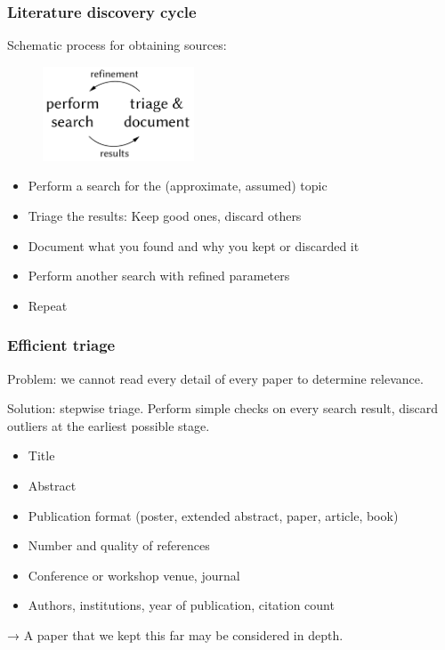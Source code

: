 \documentclass[]{beamer} %
\begin{document}
\begin{frame}
\frametitle{Literature discovery cycle}
Schematic process for obtaining sources:
\begin{figure}
	\includegraphics[width=0.4\textwidth]{fig/cycle.pdf}
	\label{fig:cycle}
\end{figure}
\begin{itemize}
	\item Perform a \alert{search} for the (approximate, assumed) topic
	\item \alert{Triage} the results: Keep good ones, discard others
	\item \alert{Document} what you found and why you kept or discarded it
	\item Perform another search with \alert{refined} parameters
	\item Repeat
\end{itemize}
\end{frame}

\begin{frame}
\frametitle{Efficient triage}
Problem: we cannot read every detail of every paper to determine relevance.

Solution: \alert{stepwise triage}. Perform simple checks on every search result, discard outliers at the earliest possible stage.
\begin{itemize}
	\item Title
	\item Abstract
	\item Publication format (poster, extended abstract, paper, article, book)
	\item Number and quality of references
	\item Conference or workshop venue, journal
	\item Authors, institutions, year of publication, citation count
\end{itemize}
→ A paper that we kept this far may be considered in depth.
\end{frame}
\end{document}
